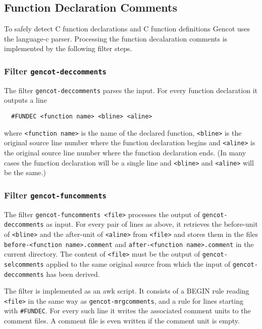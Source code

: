 \documentclass[a4paper]{report}
\newcommand{\code}[1]{\textnormal{\texttt{#1}}}
\begin{document}
\subsection{Function Declaration Comments}

To safely detect C function declarations and C function definitions Gencot uses the language-c parser. Processing the 
function decalaration comments is implemented by the following filter steps. 

\subsubsection{Filter \code{gencot-deccomments}}

The filter \code{gencot-deccomments} parses the input. For every function declaration it outputs a line
\begin{verbatim}
  #FUNDEC <function name> <bline> <aline>
\end{verbatim}
where \code{<function name>} is the name of the declared function, \code{<bline>} is the original source line 
number where the function declaration begins and \code{<aline>} is
the original source line number where the function declaration ends. (In many cases the function declaration will be
a single line and \code{<bline>} and \code{<aline>} will be the same.)

\subsubsection{Filter \code{gencot-funcomments}}

The filter \code{gencot-funcomments <file>} processes the output of \code{gencot-deccomments} as input. For every pair
of lines as above, it retrieves the before-unit of \code{<bline>} and the after-unit of \code{<aline>} from \code{<file>}
and stores them in the files \code{before-<function name>.comment} and \code{after-<function name>.comment} in the
current directory. The content of \code{<file>} must be the output of \code{gencot-selcomments} applied to the same
original source from which the input of \code{gencot-deccomments} has been derived.

The filter is implemented as an awk script. It consists of a 
BEGIN rule reading \code{<file>} in the same way as \code{gencot-mrgcomments}, and a rule for lines starting with 
\code{\#FUNDEC}. For every such line it writes the associated comment units to the comment files. A comment
file is even written if the comment unit is empty.
\end{document}
